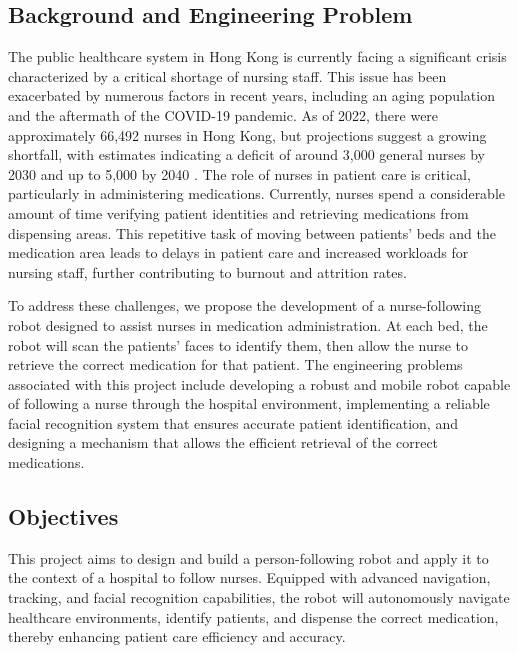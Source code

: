 \documentclass{article}
\begin{document}
\subsection{Background and Engineering Problem}
The public healthcare system in Hong Kong is currently facing a significant crisis characterized by a critical shortage of nursing staff. This issue has been exacerbated by numerous factors in recent years, including an aging population and the aftermath of the COVID-19 pandemic. As of 2022, there were approximately 66,492 nurses in Hong Kong, but projections suggest a growing shortfall, with estimates indicating a deficit of around 3,000 general nurses by 2030 and up to 5,000 by 2040 \cite{lam2022shortage}. The role of nurses in patient care is critical, particularly in administering medications. Currently, nurses spend a considerable amount of time verifying patient identities and retrieving medications from dispensing areas. This repetitive task of moving between patients' beds and the medication area leads to delays in patient care and increased workloads for nursing staff, further contributing to burnout and attrition rates.

To address these challenges, we propose the development of a nurse-following robot designed to assist nurses in medication administration. At each bed, the robot will scan the patients' faces to identify them, then allow the nurse to retrieve the correct medication for that patient. The engineering problems associated with this project include developing a robust and mobile robot capable of following a nurse through the hospital environment, implementing a reliable facial recognition system that ensures accurate patient identification, and designing a mechanism that allows the efficient retrieval of the correct medications.

\subsection{Objectives}
This project aims to design and build a person-following robot and apply it to the context of a hospital to follow nurses. Equipped with advanced navigation, tracking, and facial recognition capabilities, the robot will autonomously navigate healthcare environments, identify patients, and dispense the correct medication, thereby enhancing patient care efficiency and accuracy.
\end{document}
